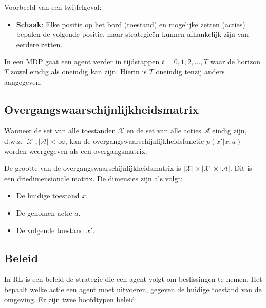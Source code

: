 \documentclass[a4paper,12pt]{report}
\begin{document}
Voorbeeld van een twijfelgeval:
\begin{itemize}
    \item \textbf{Schaak}: Elke positie op het bord (toestand) en mogelijke zetten (acties) bepalen de volgende positie, maar strategieën kunnen afhankelijk zijn van eerdere zetten.
\end{itemize}

In een MDP gaat een agent verder in tijdstappen \(t = 0, 1, 2, \ldots, T\) waar de horizon \(T\) zowel eindig als oneindig kan zijn. Hierin is \(T\) oneindig tenzij anders aangegeven.

\subsection{Overgangswaarschijnlijkheidsmatrix}

Wanneer de set van alle toestanden \(\mathcal{X}\) en de set van alle acties \(\mathcal{A}\) eindig zijn, d.w.z. \(|\mathcal{X}|, |\mathcal{A}| < \infty\), kan de overgangswaarschijnlijkheidsfunctie \(p(x'|x,a)\) worden weergegeven als een overgangsmatrix.

De grootte van de overgangswaarschijnlijkheidsmatrix is \(|\mathcal{X}| \times |\mathcal{X}| \times |\mathcal{A}|\). Dit is een driedimensionale matrix. De dimensies zijn als volgt:
\begin{itemize}
    \item De huidige toestand \(x\).
    \item De genomen actie \(a\).
    \item De volgende toestand \(x'\).
\end{itemize}

\subsection{Beleid}

In RL is een beleid de strategie die een agent volgt om beslissingen te nemen. Het bepaalt welke actie een agent moet uitvoeren, gegeven de huidige toestand van de omgeving. Er zijn twee hoofdtypen beleid:
\end{document}

